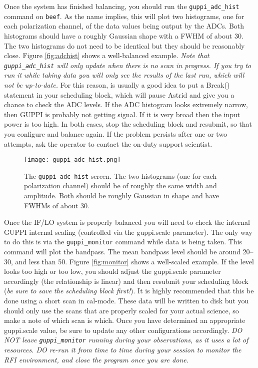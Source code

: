 Once the system has finished balancing, you should run the
\texttt{guppi\_adc\_hist} command on \texttt{beef}.  As the name
implies, this will plot two histograms, one for each polarization
channel, of the data values being output by the ADCs.  Both histograms
should have a roughly Gaussian shape with a FWHM of about 30.  The two
histograms do not need to be identical but they should be reasonably
close.  Figure \ref{fig:adchist} shows a well-balanced example.
\emph{Note that \texttt{guppi\_adc\_hist} will only update when there
  is no scan in progress.  If you try to run it while taking data you
  will only see the results of the last run, which will not be
  up-to-date.}  For this reason, is usually a good idea to put a
Break() statement in your scheduling block, which will pause Astrid
and give you a chance to check the ADC levels.  If the ADC histogram
looks extremely narrow, then GUPPI is probably not getting signal.  If
it is very broad then the input power is too high.  In both cases,
stop the scheduling block and resubmit, so that you configure and
balance again.  If the problem persists after one or two attempts, ask
the operator to contact the on-duty support scientist.

\begin{figure}
\texttt{[image: guppi\_adc\_hist.png]}
\caption[The GUPPI ADC histogram display]{The
  \texttt{guppi\_adc\_hist} screen. The two histograms (one for each
  polarization channel) should be of roughly the same width and
  amplitude.  Both should be roughly Gaussian in shape and have FWHMs
  of about 30.  \label{fig:gupstat}}
\label{fig:guppistatus}
\end{figure}

Once the IF/LO system is properly balanced you will need to check the
internal GUPPI internal scaling (controlled via the guppi.scale
parameter).  The only way to do this is via the
\texttt{guppi\_monitor} command while data is being taken.  This
command will plot the bandpass.  The mean bandpass level should be
around 20--30, and less than 50.  Figure \ref{fig:monitor} shows a
well-scaled example.  If the level looks too high or too low, you
should adjust the guppi.scale parameter accordingly (the relationship
is linear) and then resubmit your scheduling block (\emph{be sure to
  save the scheduling block first!}).  It is highly recommended that
this be done using a short scan in cal-mode.  These data will be
written to disk but you should only use the scans that are properly
scaled for your actual science, so make a note of which scan is which.
Once you have determined an appropriate guppi.scale value, be sure to
update any other configurations accordingly.  \emph{DO NOT leave
  \texttt{guppi\_monitor} running during your observations, as it uses
  a lot of resources.  DO re-run it from time to time during your
  session to monitor the RFI environment, and close the program once
  you are done.}

